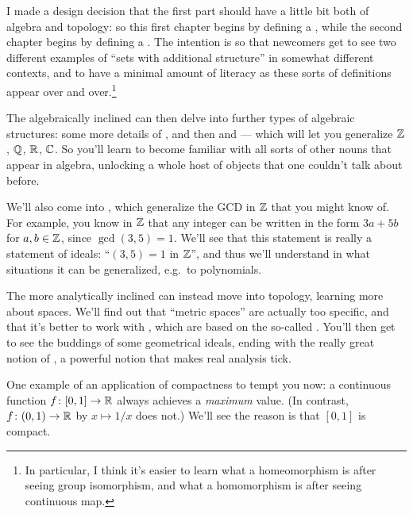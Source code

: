 \begin{itemize}
I made a design decision that the first part
should have a little bit both of algebra and topology:
so this first chapter begins by defining a ,
while the second chapter begins by defining a .
The intention is so that newcomers get to see two different
examples of ``sets with additional structure''
in somewhat different contexts,
and to have a minimal amount of literacy as these sorts
of definitions appear over and over.\footnote{In particular,
	I think it's easier to learn
	what a homeomorphism is after seeing group isomorphism,
	and what a homomorphism is after seeing continuous map.}

The algebraically inclined can then delve into
further types of algebraic structures:
some more details of ,
and then  and  ---
which will let you generalize $\mathbb Z$, $\mathbb Q$, $\mathbb R$, $\mathbb C$.
So you'll learn to become familiar with all sorts of other nouns
that appear in algebra, unlocking a whole host of objects
that one couldn't talk about before.

We'll also come into ,
which generalize the GCD in $\mathbb Z$ that you might know of.
For example, you know in $\mathbb Z$ that any integer
can be written in the form $3a+5b$ for $a,b \in \mathbb Z$,
since $\gcd(3,5)=1$.
We'll see that this statement is really
a statement of ideals: ``$(3,5)=1$ in $\mathbb Z$'',
and thus we'll understand in what situations
it can be generalized, e.g.\ to polynomials.

The more analytically inclined can instead move into topology,
learning more about spaces.
We'll find out that ``metric spaces'' are actually too specific,
and that it's better to work with ,
which are based on the so-called .
You'll then get to see the buddings of some geometrical ideals,
ending with the really great notion of ,
a powerful notion that makes real analysis tick.

One example of an application of compactness to tempt you now:
a continuous function $f \colon [0,1] \to \mathbb R$
always achieves a \emph{maximum} value.
(In contrast, $f \colon (0,1) \to \mathbb R$ by $x \mapsto 1/x$ does not.)
We'll see the reason is that $[0,1]$ is compact.
\end{itemize}

